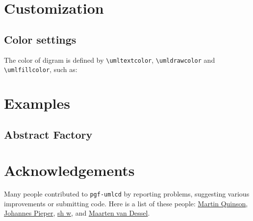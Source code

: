 \documentclass{article}
\newcommand{\demo}[2][1]{
\begin{minipage}{.49\linewidth}
\centering
\resizebox{#1\linewidth}{!}{

}
\end{minipage}
\hspace{0.01\linewidth}
\begin{minipage}{.5\linewidth}

\end{minipage}
}
\newcommand{\example}[1]{
\resizebox{\linewidth}{!}{

}

}
\begin{document}
\section{Customization}
\subsection{Color settings}
The color of digram is defined by \lstinline|\umltextcolor|, \lstinline|\umldrawcolor| and \lstinline|\umlfillcolor|, such as:

\demo{color}


\section{Examples}
\subsection{Abstract Factory}
\example{abstract-factory}

\section{Acknowledgements}
Many people contributed to \texttt{pgf-umlcd} by reporting problems,
suggesting various improvements or submitting code. Here is a list of
these people: \href{mailto:martin.quinson@loria.fr}{Martin Quinson},
\href{mailto:johannes_pieper@yahoo.de}{Johannes Pieper},
\href{mailto:lwghsh@gmail.com}{sh w},
and \href{mailto:maartenvandessel@hotmail.com}{Maarten van Dessel}.
\end{document}
